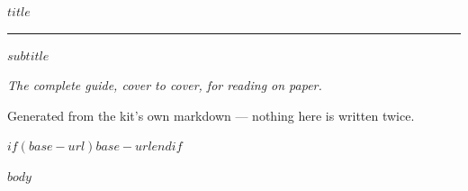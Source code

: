 \documentclass[11pt,a4paper,twoside,openright]{book}
\begin{document}
\frontmatter
\thispagestyle{empty}
\begin{titlepage}
\centering
\vspace*{0.16\textheight}
{\sffamily\bfseries\Huge\color{GuideInk} $title$\par}
\vspace{10mm}
{\color{GuideAccent}\rule{0.42\textwidth}{1.2pt}\par}
\vspace{10mm}
{\sffamily\large\color{GuideMuted} $subtitle$\par}
\vfill
{\small\itshape\color{GuideMuted}
The complete guide, cover to cover, for reading on paper.\par
\vspace{2mm}
Generated from the kit's own markdown --- nothing here is written twice.\par}
\vspace{6mm}
{\footnotesize\sffamily\color{GuideMuted} $if(base-url)$$base-url$$endif$\par}
\end{titlepage}

\makeatletter
\renewcommand*\l@section{\@dottedtocline{1}{0em}{2.6em}}
\renewcommand*\l@subsection{\@dottedtocline{2}{2.6em}{3.2em}}
\makeatother

\cleardoublepage
{}
\setcounter{tocdepth}{$if(toc-depth)$$toc-depth$$else$2$endif$}
\tableofcontents

\mainmatter

$body$
\end{document}
